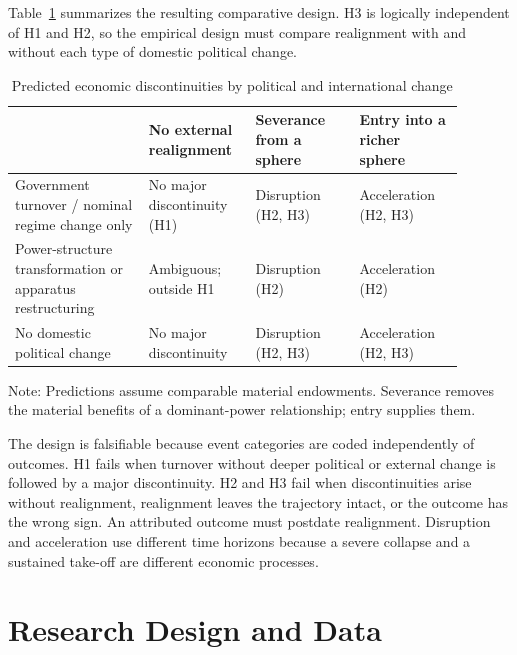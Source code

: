 \documentclass[11pt]{article}
\begin{document}
Table~\ref{tab:design} summarizes the resulting comparative design. H3 is logically independent of H1 and H2, so the empirical design must compare realignment with and without each type of domestic political change.

\begin{table}[htbp]
\centering
\begin{threeparttable}
\caption{Predicted economic discontinuities by political and international change}
\label{tab:design}
\scriptsize
\begin{tabular}{@{}p{0.27\linewidth}p{0.20\linewidth}p{0.21\linewidth}p{0.21\linewidth}@{}}
\toprule
 & No external realignment & Severance from a sphere & Entry into a richer sphere \\
\midrule
Government turnover / nominal regime change only & No major discontinuity (H1) & Disruption (H2, H3) & Acceleration (H2, H3) \\
Power-structure transformation or apparatus restructuring & Ambiguous; outside H1 & Disruption (H2) & Acceleration (H2) \\
No domestic political change & No major discontinuity & Disruption (H2, H3) & Acceleration (H2, H3) \\
\bottomrule
\end{tabular}
\begin{tablenotes}
\scriptsize
\item Note: Predictions assume comparable material endowments. Severance removes the material benefits of a dominant-power relationship; entry supplies them.
\end{tablenotes}
\end{threeparttable}
\end{table}

The design is falsifiable because event categories are coded independently of outcomes. H1 fails when turnover without deeper political or external change is followed by a major discontinuity. H2 and H3 fail when discontinuities arise without realignment, realignment leaves the trajectory intact, or the outcome has the wrong sign. An attributed outcome must postdate realignment. Disruption and acceleration use different time horizons because a severe collapse and a sustained take-off are different economic processes.

\section{Research Design and Data}
\label{sec:design}
\end{document}
